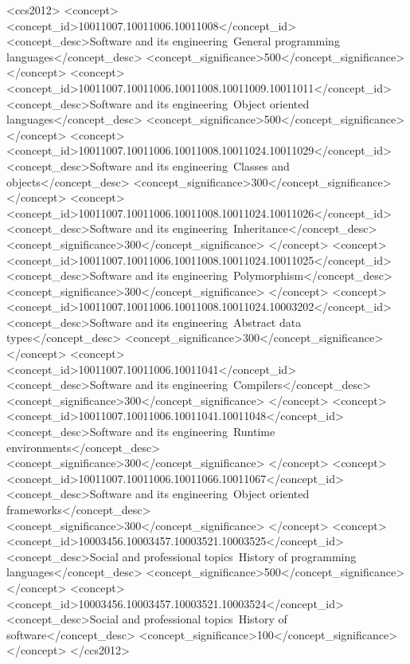 \documentclass[acmsmall,screen]{acmart}
\begin{document}
\begin{CCSXML}
<ccs2012>
    <concept>
        <concept_id>10011007.10011006.10011008</concept_id>
        <concept_desc>Software and its engineering~General programming languages</concept_desc>
        <concept_significance>500</concept_significance>
        </concept>
   <concept>
       <concept_id>10011007.10011006.10011008.10011009.10011011</concept_id>
       <concept_desc>Software and its engineering~Object oriented languages</concept_desc>
       <concept_significance>500</concept_significance>
       </concept>
   <concept>
       <concept_id>10011007.10011006.10011008.10011024.10011029</concept_id>
       <concept_desc>Software and its engineering~Classes and objects</concept_desc>
       <concept_significance>300</concept_significance>
       </concept>
   <concept>
       <concept_id>10011007.10011006.10011008.10011024.10011026</concept_id>
       <concept_desc>Software and its engineering~Inheritance</concept_desc>
       <concept_significance>300</concept_significance>
       </concept>
   <concept>
       <concept_id>10011007.10011006.10011008.10011024.10011025</concept_id>
       <concept_desc>Software and its engineering~Polymorphism</concept_desc>
       <concept_significance>300</concept_significance>
       </concept>
   <concept>
       <concept_id>10011007.10011006.10011008.10011024.10003202</concept_id>
       <concept_desc>Software and its engineering~Abstract data types</concept_desc>
       <concept_significance>300</concept_significance>
       </concept>
   <concept>
       <concept_id>10011007.10011006.10011041</concept_id>
       <concept_desc>Software and its engineering~Compilers</concept_desc>
       <concept_significance>300</concept_significance>
       </concept>
   <concept>
       <concept_id>10011007.10011006.10011041.10011048</concept_id>
       <concept_desc>Software and its engineering~Runtime environments</concept_desc>
       <concept_significance>300</concept_significance>
       </concept>
   <concept>
       <concept_id>10011007.10011006.10011066.10011067</concept_id>
       <concept_desc>Software and its engineering~Object oriented frameworks</concept_desc>
       <concept_significance>300</concept_significance>
       </concept>
   <concept>
       <concept_id>10003456.10003457.10003521.10003525</concept_id>
       <concept_desc>Social and professional topics~History of programming languages</concept_desc>
       <concept_significance>500</concept_significance>
       </concept>
   <concept>
       <concept_id>10003456.10003457.10003521.10003524</concept_id>
       <concept_desc>Social and professional topics~History of software</concept_desc>
       <concept_significance>100</concept_significance>
       </concept>
 </ccs2012>
\end{CCSXML}
\end{document}
